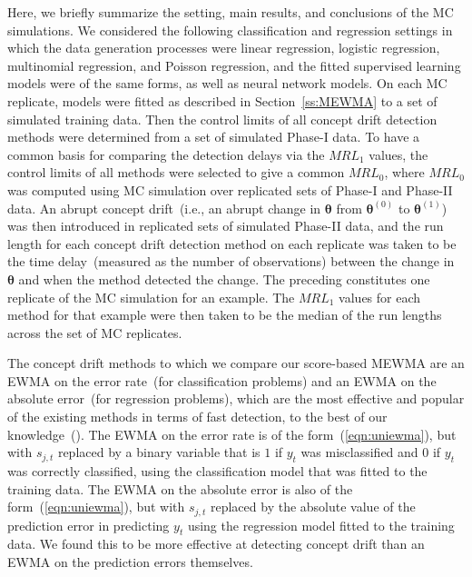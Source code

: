 \documentclass[twoside,11pt]{article}
\begin{document}
Here, we briefly summarize the setting, main results, and conclusions of the MC simulations. We considered the following classification and regression settings in which the data generation processes were linear regression, logistic regression, multinomial regression, and Poisson regression, and the fitted supervised learning models were of the same forms, as well as neural network models. On each MC replicate, models were fitted as described in Section~\ref{ss:MEWMA} to a set of simulated training data. Then the control limits of all concept drift detection methods were determined from a set of simulated Phase-I data. To have a common basis for comparing the detection delays via the $MRL_1$ values, the control limits of all methods were selected to give a common $MRL_0$, where $MRL_0$ was computed using MC simulation over replicated sets of Phase-I and Phase-II data. An abrupt concept drift~(i.e., an abrupt change in $\bm{\theta}$ from $\bm{\theta}^{(0)}$ to $\bm{\theta}^{(1)}$) was then introduced in replicated sets of simulated Phase-II data, and the run length for each concept drift detection method on each replicate was taken to be the time delay~(measured as the number of observations) between the change in $\bm{\theta}$ and when the method detected the change. The preceding constitutes one replicate of the MC simulation for an example. The $MRL_1$ values for each method for that example were then taken to be the median of the run lengths across the set of MC replicates.

The concept drift methods to which we compare our score-based MEWMA are an EWMA on the error rate~(for classification problems) and an EWMA on the absolute error~(for regression problems), which are the most effective and popular of the existing methods in terms of fast detection, to the best of our knowledge~(\cite{ross2012exponentially,barros2018large,lu2018learning}). The EWMA on the error rate is of the form~(\ref{eqn:uniewma}), but with $s_{j,t}$ replaced by a binary variable that is $1$ if $y_t$ was misclassified and $0$ if $y_t$ was correctly classified, using the classification model that was fitted to the training data. The EWMA on the absolute error is also of the form~(\ref{eqn:uniewma}), but with $s_{j,t}$ replaced by the absolute value of the prediction error in predicting $y_t$ using the regression model fitted to the training data. We found this to be more effective at detecting concept drift than an EWMA on the prediction errors themselves. %
\end{document}
